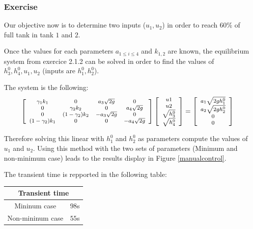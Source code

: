 \subsubsection{Exercise}

Our objective now is to determine two inputs ($u_1, u_2$) in order to reach $60\%$ of full tank in tank $1$ and $2$.

Once the values for each parameters $a_{1 \leq i \leq 4}$ and $k_{1,2}$ are known, the equilibrium system from exercice 2.1.2 can be solved in order to find the values of $h_3^0,h_4^0,u_1,u_2$ (inputs are $h_1^0,h_2^0$).  

The system is the following:
$$
    \footnotesize
\left[
    \begin{array}{cccc}
        \gamma_1 k_1 & 0 & a_3 \sqrt{2g} & 0 \\
        0 & \gamma_2 k_2 & 0 & a_4 \sqrt{2g} \\
        0 & (1-\gamma_2) k_2 & -a_3 \sqrt{2g} & 0 \\
        (1-\gamma_2) k_1 & 0 & 0 & -a_4 \sqrt{2g} \\
    \end{array}
\right]
\left[
    \begin{array}{c}
        u1 \\ u2 \\ \sqrt{h_3^0} \\ \sqrt{h_4^0}
    \end{array}
\right]
=
\left[
    \begin{array}{c}
        a_1 \sqrt{2gh_1^0} \\
        a_2 \sqrt{2gh_2^0} \\
        0 \\
        0 \\
    \end{array}
\right]
$$

Therefore solving this linear with $h_1^0$ and $h_2^0$ as parameters compute the values of $u_1$ and $u_2$. 
Using this method with the two sets of parameters (Minimum and non-minimum case) leads to the results display in Figure \ref{manualcontrol}.

The transient time is repported in the following table:

\begin{center}
    \footnotesize
\begin{tabular}{|cc|}
    \hline
    \multicolumn{2}{|c|}{Transient time} \\
    \hline
    Mininum case & $98$s \\
    Non-mininum case & $55$s \\
    \hline
\end{tabular}
\end{center}

